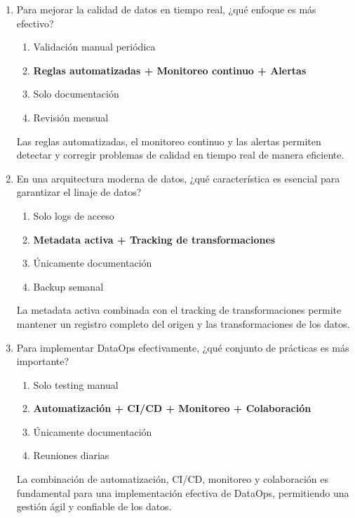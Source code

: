 \documentclass[12pt]{article}
\begin{document}
\begin{enumerate}[label=\arabic*.]
\item Para mejorar la calidad de datos en tiempo real, ¿qué enfoque es más efectivo?
\begin{enumerate}
    \item Validación manual periódica
    \item \textbf{Reglas automatizadas + Monitoreo continuo + Alertas}
    \item Solo documentación
    \item Revisión mensual
\end{enumerate}
Las reglas automatizadas, el monitoreo continuo y las alertas permiten detectar y corregir problemas de calidad en tiempo real de manera eficiente.

\item En una arquitectura moderna de datos, ¿qué característica es esencial para garantizar el linaje de datos?
\begin{enumerate}
    \item Solo logs de acceso
    \item \textbf{Metadata activa + Tracking de transformaciones}
    \item Únicamente documentación
    \item Backup semanal
\end{enumerate}
La metadata activa combinada con el tracking de transformaciones permite mantener un registro completo del origen y las transformaciones de los datos.

\item Para implementar DataOps efectivamente, ¿qué conjunto de prácticas es más importante?
\begin{enumerate}
    \item Solo testing manual
    \item \textbf{Automatización + CI/CD + Monitoreo + Colaboración}
    \item Únicamente documentación
    \item Reuniones diarias
\end{enumerate}
La combinación de automatización, CI/CD, monitoreo y colaboración es fundamental para una implementación efectiva de DataOps, permitiendo una gestión ágil y confiable de los datos.

\end{enumerate}
\end{document}
